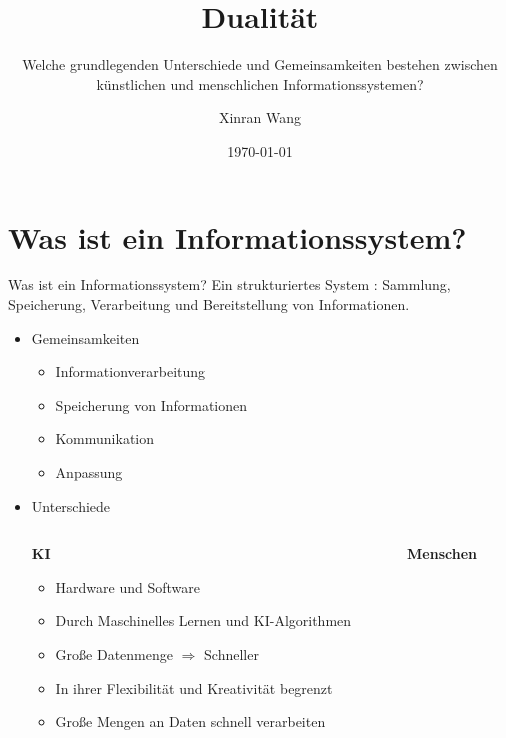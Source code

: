 \documentclass[169,9pt]{beamer}
\title[Dualität]{Dualität} %
\subtitle[]{Welche grundlegenden Unterschiede und
Gemeinsamkeiten bestehen zwischen
künstlichen und menschlichen
Informationssystemen?} %
\author[X. Wang]{Xinran Wang}
\date{\today} %
\begin{document}
\maketitle

\section{Was ist ein Informationssystem?}\sectionFrame

\begin{frame}{Was ist ein Informationssystem?}
Ein strukturiertes System : Sammlung, Speicherung, Verarbeitung und Bereitstellung von Informationen.
    \begin{itemize}
        \item Gemeinsamkeiten
              \begin{itemize}
                  \item<1-> Informationverarbeitung
                  \item<1-> Speicherung von Informationen
                  \item<1-> Kommunikation
                  \item<1-> Anpassung
              \end{itemize}
    \end{itemize}
    \begin{itemize}
        \item<2-> Unterschiede
            \begin{columns}
                \begin{column}{0.45\textwidth}
                    \textbf{KI}
                        \begin{itemize}
                            \item Hardware und Software
                            \item Durch Maschinelles Lernen und KI-Algorithmen
                            \item Große Datenmenge \(\Rightarrow\) Schneller
                            \item In ihrer Flexibilität und Kreativität begrenzt
                            \item Große Mengen an Daten schnell verarbeiten
                        \end{itemize}
                \end{column}
                \begin{column}{0.45\textwidth}
                    \textbf{Menschen}
                        \begin{itemize}

\end{itemize}
\end{column}
\end{columns}
\end{itemize}
\end{frame}
\end{document}
